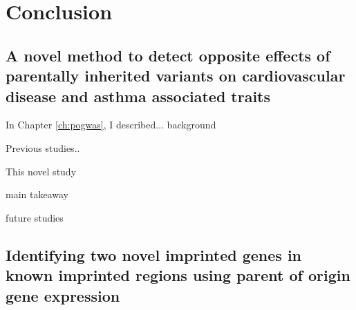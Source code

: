 \chapter{Conclusion}

\section{A novel method to detect opposite effects of parentally inherited variants on cardiovascular disease and asthma associated traits}
 
 In Chapter \ref{ch:pogwas}, I described...  background
 
 
 Previous  studies.. 
 
 This novel study
 
main takeaway

future studies
 
\section{Identifying two novel imprinted genes in known imprinted regions using parent of origin gene expression}